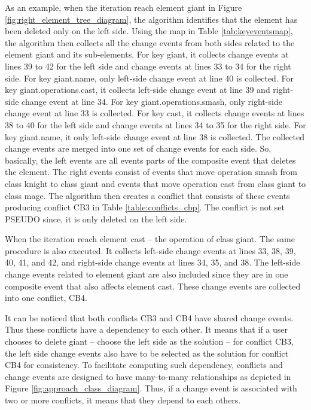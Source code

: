 As an example, when the iteration reach element \textsf{giant} in Figure \ref{fig:right_element_tree_diagram}, the algorithm identifies that the element has been deleted only on the left side.
Using the map in Table \ref{tab:keyeventsmap}, the algorithm then collects all the change events from both sides related to the element \textsf{giant} and its sub-elements. For key \textsf{giant}, it collects change events at lines 39 to 42 for the left side and change events at lines 33 to 34 for the right side. For key \textsf{giant.name}, only left-side change event at line 40 is collected.
For key \textsf{giant.operations.cast}, it collects left-side change event at line 39 and right-side change event at line 34.
For key \textsf{giant.operations.smash}, only right-side change event at line 33 is collected. 
For key \textsf{cast}, it collects change events at lines 38 to 40 for the left side and change events at lines 34 to 35 for the right side.
For key \textsf{giant.name}, it only left-side change event at line 38 is collected.
The collected change events are merged into one set of change events for each side. 
So, basically, the left events are all events parts of the composite event that deletes the element. 
The right events consist of events that move operation \textsf{smash} from class \textsf{knight} to class \textsf{giant} and events that
move operation \textsf{cast} from class \textsf{giant} to class \textsf{mage}. The algorithm then creates a conflict that consists of these events 
producing conflict \textsf{CB3} in Table \ref{table:conflicts_cbp}. The conflict is not set \textsf{PSEUDO} since, it is only deleted on the left side. 

When the iteration reach element \textsf{cast} -- the operation of class \textsf{giant}. The same procedure is also executed. It collects left-side change events at lines 33, 38, 39, 40, 41, and 42, and right-side change events at lines 34, 35, and 38. The left-side change events related to element \textsf{giant} are also included since they are in one composite event that also affects element \textsf{cast}. These change events are collected into one conflict, \textsf{CB4}. 

It can be noticed that both conflicts \textsf{CB3} and \textsf{CB4} have shared change events. Thus these conflicts have a dependency to each other. It means that if a user chooses to delete \textsf{giant} -- choose the left side as the solution -- for conflict \textsf{CB3}, the left side change events also have to be selected as the solution for conflict \textsf{CB4} for consistency. To facilitate computing such dependency, conflicts and change events are designed to have many-to-many relationships as depicted in Figure \ref{fig:approach_class_diagram}. Thus, if a change event is associated with two or more conflicts, it means that they depend to each others.

